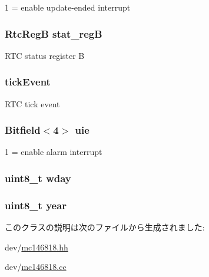 1 = enable update-\/ended interrupt \hypertarget{classMC146818_a59e2e13d7510625623f5f3e08ce29b1a}{
\subsubsection[{stat\_\-regB}]{\setlength{\rightskip}{0pt plus 5cm}RtcRegB {\bf stat\_\-regB}}}
\label{classMC146818_a59e2e13d7510625623f5f3e08ce29b1a}
RTC status register B \hypertarget{classMC146818_afa706dc4758601c480227eead115ccfb}{
\subsubsection[{tickEvent}]{ {\bf tickEvent}}}
\label{classMC146818_afa706dc4758601c480227eead115ccfb}
RTC tick event \hypertarget{classMC146818_ad8be3702ba014f17744bad97962b3942}{
\subsubsection[{uie}]{\setlength{\rightskip}{0pt plus 5cm}Bitfield$<$4$>$ {\bf uie}}}
\label{classMC146818_ad8be3702ba014f17744bad97962b3942}


1 = enable alarm interrupt \hypertarget{classMC146818_acf7d2d98117c452b351c130883b70eba}{
\subsubsection[{wday}]{\setlength{\rightskip}{0pt plus 5cm}uint8\_\-t {\bf wday}}}
\label{classMC146818_acf7d2d98117c452b351c130883b70eba}
\hypertarget{classMC146818_a7af2065789bc84419b8d5fe109be83b5}{
\subsubsection[{year}]{\setlength{\rightskip}{0pt plus 5cm}uint8\_\-t {\bf year}}}
\label{classMC146818_a7af2065789bc84419b8d5fe109be83b5}


このクラスの説明は次のファイルから生成されました:\begin{DoxyCompactItemize}
\item 
dev/\hyperlink{mc146818_8hh}{mc146818.hh}\item 
dev/\hyperlink{mc146818_8cc}{mc146818.cc}\end{DoxyCompactItemize}
